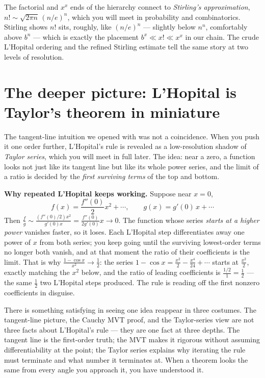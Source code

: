 \begin{connectionbox}
The factorial and $x^x$ ends of the hierarchy connect to \emph{Stirling's
approximation}, $n!\sim \sqrt{2\pi n}\,(n/e)^n$, which you will meet in probability and
combinatorics. Stirling shows $n!$ sits, roughly, like $(n/e)^n$ --- slightly below
$n^n$, comfortably above $b^n$ --- which is exactly the placement
$b^x\ll x!\ll x^x$ in our chain. The crude L'Hopital ordering and the refined Stirling
estimate tell the same story at two levels of resolution.
\end{connectionbox}

\section{The deeper picture: L'Hopital is Taylor's theorem in miniature}

The tangent-line intuition we opened with was not a coincidence. When you push it one
order further, L'Hopital's rule is revealed as a low-resolution shadow of \emph{Taylor
series}, which you will meet in full later. The idea: near a zero, a function looks not
just like its tangent line but like its whole power series, and the limit of a ratio is
decided by the \emph{first surviving terms} of the top and bottom.

\begin{happeningbox}
\textbf{Why repeated L'Hopital keeps working.} Suppose near $x=0$,
\[
f(x)=\frac{f''(0)}{2}x^2+\cdots,\qquad g(x)=g'(0)\,x+\cdots
\]
Then $\tfrac{f}{g}\sim \tfrac{(f''(0)/2)x^2}{g'(0)x}=\tfrac{f''(0)}{2g'(0)}x\to 0$.
The function whose series \emph{starts at a higher power} vanishes faster, so it loses.
Each L'Hopital step differentiates away one power of $x$ from both series; you keep
going until the surviving lowest-order terms no longer both vanish, and at that moment
the ratio of their coefficients is the limit. That is why
$\tfrac{1-\cos x}{x^2}\to\tfrac12$: the series
$1-\cos x=\tfrac{x^2}{2}-\tfrac{x^4}{24}+\cdots$ starts at $\tfrac{x^2}{2}$, exactly
matching the $x^2$ below, and the ratio of leading coefficients is
$\tfrac{1/2}{1}=\tfrac12$ --- the same $\tfrac12$ two L'Hopital steps produced. The
rule is reading off the first nonzero coefficients in disguise.
\end{happeningbox}

\begin{aestheticbox}
There is something satisfying in seeing one idea reappear in three costumes. The
tangent-line picture, the Cauchy MVT proof, and the Taylor-series view are not three
facts about L'Hopital's rule --- they are one fact at three depths. The tangent line is
the first-order truth; the MVT makes it rigorous without assuming differentiability at
the point; the Taylor series explains why iterating the rule must terminate and what
number it terminates at. When a theorem looks the same from every angle you approach
it, you have understood it.
\end{aestheticbox}


